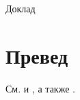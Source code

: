 \documentclass[14pt]{extarticle}
\begin{document}
\thispagestyle{empty}
Доклад

\newpage

\tableofcontents
\newpage

\section{Превед}

См.
\cite{berlin2019}
и
\cite{bi07},
а также
\cite{Miskolc,Sozopol,Obuhovo}.

\printbibliography[heading=bibintoc]%
\nocite{*}
\end{document}
